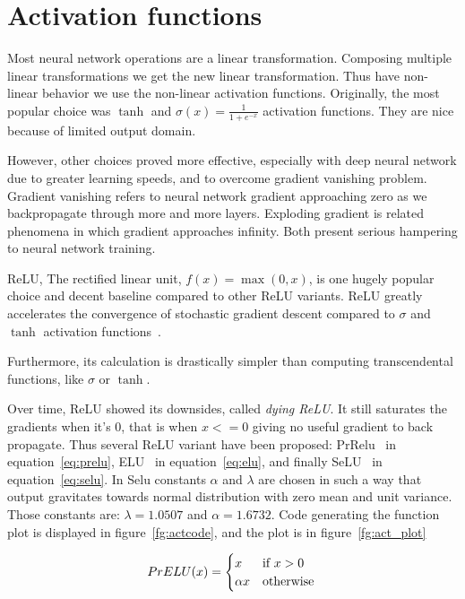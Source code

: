 \documentclass[times, utf8, diplomski, english]{fer}
\begin{document}
\section{Activation functions}
\label{sec:activation}

Most neural network operations are a linear transformation. Composing multiple linear transformations we get the new linear transformation. Thus have non-linear behavior we use the non-linear activation functions. Originally, the most popular choice was $\tanh$ and $\sigma(x) = \frac{1}{1 + e^{-x}} $ activation functions. They are nice because of limited output domain. 

However, other choices proved more effective, especially with deep neural network due to greater learning speeds, and to overcome gradient vanishing problem. Gradient vanishing refers to neural network gradient approaching zero as we backpropagate through more and more layers. Exploding gradient is related phenomena in which gradient approaches infinity. Both present serious hampering to neural network training.

ReLU, The rectified linear unit, $f(x) = \max(0, x)$,  is one hugely popular choice and decent baseline compared to other ReLU variants. ReLU greatly accelerates the convergence of stochastic gradient descent compared to $\sigma$ and $\tanh$ activation functions~\citep{NIPS2012_4824}. 

Furthermore, its calculation is drastically simpler than computing transcendental functions, like $\sigma$ or $\tanh$.

Over time, ReLU showed its downsides, called \textit{dying ReLU}. It still saturates the gradients when it's 0, that is when $x <= 0$ giving no useful gradient to back propagate. Thus several ReLU variant have been proposed: PrRelu~\citep{prelu} in equation~\ref{eq:prelu}, ELU~\citep{elu} in equation~\ref{eq:elu}, and finally SeLU~\citep{selu} in equation~\ref{eq:selu}. In Selu constants $\alpha$ and $\lambda$ are chosen in such a way that output gravitates towards normal distribution with zero mean and unit variance. Those constants are: $\lambda = 1.0507$ and $\alpha = 1.6732$. 
Code generating the function plot is displayed in figure~\ref{fg:actcode}, and the plot is in figure~\ref{fg:act_plot}

\begin{equation}    
\label{eq:prelu}
PrELU(x)=
\begin{cases}
x & \text{if}\ x>0 \\
\alpha x & \text{otherwise}
\end{cases}\\
\end{equation}
\end{document}
